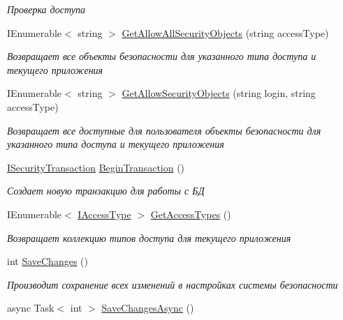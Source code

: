 \begin{DoxyCompactItemize}
\begin{DoxyCompactList}\small\item\em Проверка доступа \end{DoxyCompactList}\item 
I\+Enumerable$<$ string $>$ \hyperlink{class_security_1_1_core_security_acf070051371bf58f0f4b082e5f6b7352}{Get\+Allow\+All\+Security\+Objects} (string access\+Type)
\begin{DoxyCompactList}\small\item\em Возвращает все объекты безопасности для указанного типа доступа и текущего приложения \end{DoxyCompactList}\item 
I\+Enumerable$<$ string $>$ \hyperlink{class_security_1_1_core_security_ad9dd82159ce61eba5ab68fed5167ec87}{Get\+Allow\+Security\+Objects} (string login, string access\+Type)
\begin{DoxyCompactList}\small\item\em Возвращает все доступные для пользователя объекты безопасности для указанного типа доступа и текущего приложения \end{DoxyCompactList}\item 
\hyperlink{interface_security_1_1_interfaces_1_1_i_security_transaction}{I\+Security\+Transaction} \hyperlink{class_security_1_1_core_security_a7dd6592ac290133f4f0182cfef41547b}{Begin\+Transaction} ()
\begin{DoxyCompactList}\small\item\em Создает новую транзакцию для работы с БД \end{DoxyCompactList}\item 
I\+Enumerable$<$ \hyperlink{interface_security_1_1_interfaces_1_1_model_1_1_i_access_type}{I\+Access\+Type} $>$ \hyperlink{class_security_1_1_core_security_a874a60fc9733766b2530c295a7009aed}{Get\+Access\+Types} ()
\begin{DoxyCompactList}\small\item\em Возвращает коллекцию типов доступа для текущего приложения \end{DoxyCompactList}\item 
int \hyperlink{class_security_1_1_core_security_a85c19dc69e9698e6d6df724721ae5795}{Save\+Changes} ()
\begin{DoxyCompactList}\small\item\em Производит сохранение всех изменений в настройках системы безопасности \end{DoxyCompactList}\item 
async Task$<$ int $>$ \hyperlink{class_security_1_1_core_security_ac1c356b6ee81025a45d145512dfd41b7}{Save\+Changes\+Async} ()

\end{DoxyCompactItemize}
